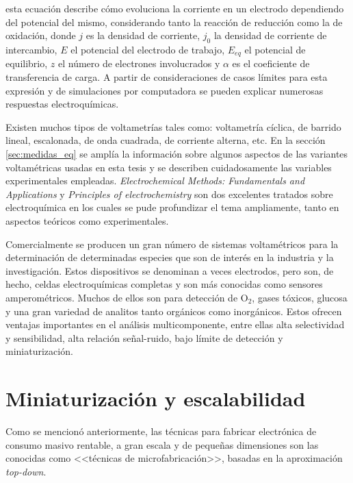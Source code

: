 		\noindent esta ecuación describe cómo evoluciona la corriente en un electrodo dependiendo del potencial del mismo, considerando tanto la reacción de reducción como la de oxidación, donde $j$ es la densidad de corriente, $j_0$ la densidad de corriente de intercambio, $E$ el potencial del electrodo de trabajo, $E_{eq}$ el potencial de equilibrio, $z$ el número de electrones involucrados y $\alpha$ es el coeficiente de transferencia de carga. A partir de consideraciones de casos límites para esta expresión y de simulaciones por computadora se pueden explicar numerosas respuestas electroquímicas.

		Existen muchos tipos de voltametrías tales como: voltametría cíclica, de barrido lineal, escalonada, de onda cuadrada, de corriente alterna, etc. En la sección \ref{sec:medidas_eq} se amplía la información sobre algunos aspectos de las variantes voltamétricas usadas en esta tesis y se describen cuidadosamente las variables experimentales empleadas. \textit{Electrochemical Methods: Fundamentals and Applications}\cite{Wi2000} y  \textit{Principles of electrochemistry}\cite{koryta1993} son dos excelentes tratados sobre electroquímica en los cuales se pude profundizar el tema ampliamente, tanto en aspectos teóricos como experimentales. 

		Comercialmente se producen un gran número de sistemas voltamétricos para la determinación de determinadas especies que son de interés en la industria y la investigación. Estos dispositivos se denominan a veces electrodos, pero son, de hecho, celdas electroquímicas completas y son más conocidas como sensores amperométricos. Muchos de ellos son para detección de O$_2$, gases tóxicos, glucosa y una gran variedad de analitos tanto orgánicos como inorgánicos. Estos ofrecen ventajas importantes en el análisis multicomponente, entre ellas alta selectividad y sensibilidad, alta relación señal-ruido, bajo límite de detección y miniaturización.\cite{bakker2006,stradiotto2003,harris2013,Ciosek2007,Kojima2003}
			
\section{Miniaturización y escalabilidad}\label{sec:microfabricacion}\label{sec:intro_fotolito}
		
		Como se mencionó anteriormente, las técnicas para fabricar electrónica de consumo masivo rentable, a gran escala y de pequeñas dimensiones son las conocidas como <<técnicas de microfabricación>>, basadas en la aproximación \textit{top-down}. \cite{Jaeger2001}

